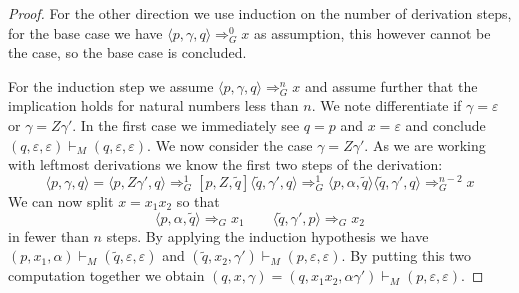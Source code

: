 \begin{proof}
For the other direction we use induction on the number of derivation steps, for
the base case we have $\langle p,\gamma,q\rangle \Rightarrow_G^0 x$ as assumption, this however
cannot be the case, so the base case is concluded.

For the induction step we assume $\langle p,\gamma,q\rangle \Rightarrow_G^n x$ and assume
further that the implication holds for natural numbers less than $n$. We note
differentiate if $\gamma=\varepsilon$ or $\gamma=Z\gamma'$. In the first case
we immediately see $q=p$ and $x=\varepsilon$ and conclude
$(q,\varepsilon,\varepsilon)\vdash_M(q,\varepsilon,\varepsilon)$. We now consider the
case $\gamma = Z\gamma'$. As we are working with leftmost derivations we
know the first two steps of the derivation:
\[
\langle p,\gamma,q \rangle=\langle p,Z\gamma',q \rangle  \Rightarrow_G^{1}
[p,Z,\tilde q]\langle \tilde q,\gamma',q \rangle  \Rightarrow_G^{1}
\langle p,\alpha, \tilde q \rangle\langle \tilde q,\gamma',q \rangle
 \Rightarrow_G^{n-2} x
\]
We can now split $x=x_1x_2$ so that
\[
  \langle p,\alpha, \tilde q \rangle \Rightarrow_G x_1 \qquad \langle \tilde q,\gamma',
  p \rangle \Rightarrow_G x_2
\]
in fewer than $n$ steps. By applying the induction hypothesis we have
$(p, x_1,\alpha)\vdash_M (\tilde q, \varepsilon,\varepsilon)$ and
$(\tilde q, x_2,\gamma')\vdash_M (p, \varepsilon,\varepsilon)$.
By putting this two computation together we obtain
$(q, x,\gamma)=(q, x_1x_2,\alpha\gamma')\vdash_M (p, \varepsilon,\varepsilon)$.
\end{proof}
